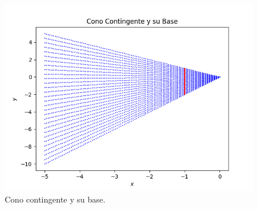 \begin{figure}[h]
\centering
\includegraphics[scale=0.6]{pec3_ex2_TS.png}
\caption{
    Cono contingente y su base.
}
\label{ex2_plot_TS}
\end{figure}
